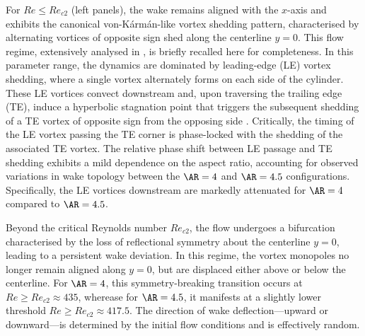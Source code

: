For $Re \le Re_{c2}$ (left panels), the wake remains aligned with the $x$-axis and exhibits the canonical von-K\'{a}rm\'{a}n-like vortex shedding pattern, characterised by alternating vortices of opposite sign shed along the centerline $y=0$. This flow regime, extensively analysed in \cite{chiarini-quadrio-auteri-2022}, is briefly recalled here for completeness. In this parameter range, the dynamics are dominated by leading-edge (LE) vortex shedding, where a single vortex alternately forms on each side of the cylinder. These LE vortices convect downstream and, upon traversing the trailing edge (TE), induce a hyperbolic stagnation point that triggers the subsequent shedding of a TE vortex of opposite sign from the opposing side \citep{chiarini-quadrio-auteri-2022}.
%
Critically, the timing of the LE vortex passing the TE corner is phase-locked with the shedding of the associated TE vortex. The relative phase shift between LE passage and TE shedding exhibits a mild dependence on the aspect ratio, accounting for observed variations in wake topology between the $\AR=4$ and $\AR=4.5$ configurations. Specifically, the LE vortices downstream are markedly attenuated for $\AR=4$ compared to $\AR=4.5$.

Beyond the critical Reynolds number $Re_{c2}$, the flow undergoes a bifurcation characterised by the loss of reflectional symmetry about the centerline $y=0$, leading to a persistent wake deviation. In this regime, the vortex monopoles no longer remain aligned along $y=0$, but are displaced either above or below the centerline. For $\AR=4$, this symmetry-breaking transition occurs at $Re \ge Re_{c2} \approx 435$, wherease for $\AR=4.5$, it manifests at a slightly lower threshold $Re \ge Re_{c2} \approx 417.5$. The direction of wake deflection---upward or downward---is determined by the initial flow conditions and is effectively random.

